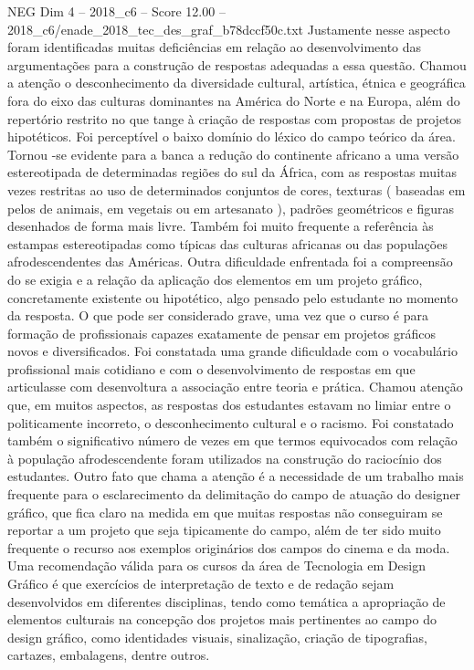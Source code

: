 \begin{textsample}{NEG Dim 4 – 2018\_c6 – Score 12.00 – 2018\_c6/enade\_2018\_tec\_des\_graf\_b78dccf50c.txt}
Justamente nesse aspecto foram identificadas muitas deficiências em relação ao desenvolvimento das argumentações para a construção de respostas adequadas a essa questão.
Chamou a atenção o desconhecimento da diversidade cultural, artística, étnica e geográfica fora do eixo das culturas dominantes na América do Norte e na Europa, além do repertório restrito no que tange à criação de respostas com propostas de projetos hipotéticos.
Foi perceptível o baixo domínio do léxico do campo teórico da área.
Tornou -se evidente para a banca a redução do continente africano a uma versão estereotipada de determinadas regiões do sul da África, com as respostas muitas vezes restritas ao uso de determinados conjuntos de cores, texturas ( baseadas em pelos de animais, em vegetais ou em artesanato ), padrões geométricos e figuras desenhados de forma mais livre.
Também foi muito frequente a referência às estampas estereotipadas como típicas das culturas africanas ou das populações afrodescendentes das Américas.
Outra dificuldade enfrentada foi a compreensão do se exigia e a relação da aplicação dos elementos em um projeto gráfico, concretamente existente ou hipotético, algo pensado pelo estudante no momento da resposta.
O que pode ser considerado grave, uma vez que o curso é para formação de profissionais capazes exatamente de pensar em projetos gráficos novos e diversificados.
Foi constatada uma grande dificuldade com o vocabulário profissional mais cotidiano e com o desenvolvimento de respostas em que articulasse com desenvoltura a associação entre teoria e prática.
Chamou atenção que, em muitos aspectos, as respostas dos estudantes estavam no limiar entre o politicamente incorreto, o desconhecimento cultural e o racismo.
Foi constatado também o significativo número de vezes em que termos equivocados com relação à população afrodescendente foram utilizados na construção do raciocínio dos estudantes.
Outro fato que chama a atenção é a necessidade de um trabalho mais frequente para o esclarecimento da delimitação do campo de atuação do designer gráfico, que fica claro na medida em que muitas respostas não conseguiram se reportar a um projeto que seja tipicamente do campo, além de ter sido muito frequente o recurso aos exemplos originários dos campos do cinema e da moda.
Uma recomendação válida para os cursos da área de Tecnologia em Design Gráfico é que exercícios de interpretação de texto e de redação sejam desenvolvidos em diferentes disciplinas, tendo como temática a apropriação de elementos culturais na concepção dos projetos mais pertinentes ao campo do design gráfico, como identidades visuais, sinalização, criação de tipografias, cartazes, embalagens, dentre outros.

\end{textsample}
